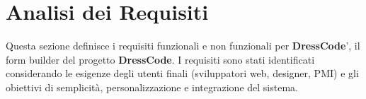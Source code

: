 \newcommand\numrequisiti{\stepcounter{requisiti}\arabic{requisiti}}
\newcommand\numvincoli{\stepcounter{vincoli}\arabic{vincoli}}
\newcommand\resetvincoli{\setcounter{vincoli}{0}}

\newcommand{\requisito}[3]{%
  \multicolumn{2}{|c|}{\cellcolor{Primary}\textcolor{white}{\textbf{REQ-DRESS-\numrequisiti\ -- #1}}} \\ \hline
  \textbf{Descrizione} & #2 \\ \hline
  \if\relax\detokenize{#3}\relax\else
  \textbf{Considerazioni} & #3 \\ \hline \fi
}
\newcommand{\vincolo}[1]{%
  \textbf{VIN-DRESS-\arabic{requisiti}.\numvincoli} & #1 \\ \hline
}

\section{\huge Analisi dei Requisiti}
Questa sezione definisce i requisiti funzionali e non funzionali per \textbf{DressCode}', il form builder del progetto \textbf{DressCode}. I requisiti sono stati identificati considerando le esigenze degli utenti finali (sviluppatori web, designer, PMI) e gli obiettivi di semplicità, personalizzazione e integrazione del sistema.

